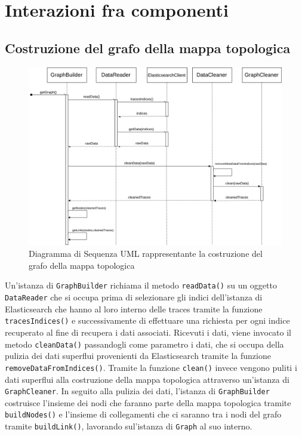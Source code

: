 
\section{Interazioni fra componenti}
\label{sec:Interazioni}
\subsection{Costruzione del grafo della mappa topologica}

\begin{figure}[H]
	\centering
	\includegraphics[width=1\textwidth]{Images/DiagrammaSequenzaGraph.png}
	\caption{Diagramma di Sequenza UML rappresentante la costruzione del grafo della mappa topologica}
	\label{img:seqGraph}
\end{figure}

Un'istanza di \texttt{GraphBuilder} richiama il metodo \texttt{readData()} su un oggetto \texttt{DataReader} che si occupa prima di selezionare gli indici dell'istanza di Elasticsearch che hanno al loro interno delle traces tramite la funzione \texttt{tracesIndices()} e successivamente di effettuare una richiesta per ogni indice recuperato al fine di recupera i dati associati.
Ricevuti i dati, viene invocato il metodo \texttt{cleanData()} passandogli come parametro i dati, che si occupa della pulizia dei dati superflui provenienti da Elasticsearch tramite la funzione \texttt{removeDataFromIndices()}. Tramite la funzione \texttt{clean()} invece vengono puliti i dati superflui alla costruzione della mappa topologica attraverso un'istanza di \texttt{GraphCleaner}.
In seguito alla pulizia dei dati, l'istanza di \texttt{GraphBuilder} costruisce l'insieme dei nodi che faranno parte della mappa topologica tramite \texttt{buildNodes()} e l'insieme di collegamenti che ci saranno tra i nodi del grafo tramite \texttt{buildLink()}, lavorando sul'istanza di \texttt{Graph} al suo interno.


